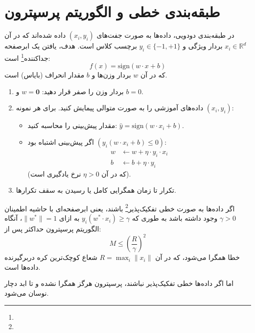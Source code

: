 \section{طبقه‌بندی خطی و الگوریتم پرسپترون \texorpdfstring{}{(Perceptron)}}
در طبقه‌بندی دودویی، داده‌ها به صورت جفت‌های $(x_i, y_i)$ داده شده‌اند که در آن $x_i \in \mathbb{R}^d$ بردار ویژگی و $y_i \in \{-1, +1\}$ برچسب کلاس است.
هدف، یافتن یک ابرصفحه جداکننده\footnote{} است:
\begin{equation}
f(x) = \text{sign}(w \cdot x + b)
\end{equation}
که در آن $w$ بردار وزن‌ها و $b$ مقدار انحراف (بایاس) است.

\begin{algorithmbox}
\begin{enumerate}
    \item بردار وزن را صفر قرار دهید: $w = \mathbf{0}$ و $b = 0$.
    \item داده‌های آموزشی را به صورت متوالی پیمایش کنید. برای هر نمونه $(x_i, y_i)$:
    \begin{itemize}
        \item مقدار پیش‌بینی را محاسبه کنید: $\hat{y} = \text{sign}(w \cdot x_i + b)$.
        \item اگر پیش‌بینی اشتباه بود $(y_i (w \cdot x_i + b) \le 0)$:
        \begin{align}
        w &\leftarrow w + \eta \cdot y_i \cdot x_i \\
        b &\leftarrow b + \eta \cdot y_i
        \end{align}
        (که در آن $\eta > 0$ نرخ یادگیری است).
    \end{itemize}
    \item تکرار تا زمان همگرایی کامل یا رسیدن به سقف تکرارها.
\end{enumerate}
\end{algorithmbox}

\begin{theorem}
اگر داده‌ها به صورت خطی تفکیک‌پذیر\footnote{} باشند، یعنی ابرصفحه‌ای با حاشیه اطمینان $\gamma > 0$ وجود داشته باشد به طوری که $y_i (w^* \cdot x_i) \ge \gamma$ به ازای $\|w^*\| = 1$، آنگاه الگوریتم پرسپترون حداکثر پس از:
\begin{equation}
M \le \left( \frac{R}{\gamma} \right)^2
\end{equation}
خطا همگرا می‌شود، که در آن $R = \max_i \|x_i\|$ شعاع کوچک‌ترین کره دربرگیرنده داده‌ها است.
\end{theorem}
اما اگر داده‌ها خطی تفکیک‌پذیر نباشند، پرسپترون هرگز همگرا نشده و تا ابد دچار نوسان می‌شود.

